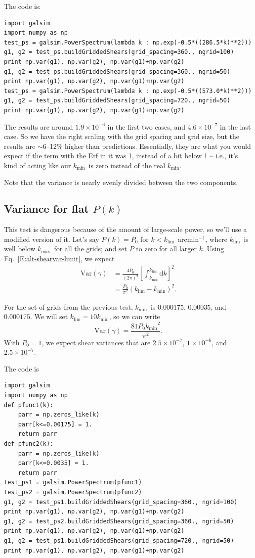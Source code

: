 \documentclass[preprint]{aastex}
\newcommand{\klim}{\ensuremath{k_\mathrm{lim}}}
\newcommand{\kmax}{\ensuremath{k_\mathrm{max}}}
\newcommand{\kmin}{\ensuremath{k_\mathrm{min}}}
\newcommand{\rmd}{\ensuremath{\mathrm{d}}}
\newcommand{\beq}{\begin{equation}}
\newcommand{\eeq}{\end{equation}}
\begin{document}
The code is:
\begin{verbatim}
import galsim
import numpy as np
test_ps = galsim.PowerSpectrum(lambda k : np.exp(-0.5*((286.5*k)**2)))
g1, g2 = test_ps.buildGriddedShears(grid_spacing=360., ngrid=100)
print np.var(g1), np.var(g2), np.var(g1)+np.var(g2)
g1, g2 = test_ps.buildGriddedShears(grid_spacing=360., ngrid=50)
print np.var(g1), np.var(g2), np.var(g1)+np.var(g2)
test_ps = galsim.PowerSpectrum(lambda k : np.exp(-0.5*((573.0*k)**2)))
g1, g2 = test_ps.buildGriddedShears(grid_spacing=720., ngrid=50)
print np.var(g1), np.var(g2), np.var(g1)+np.var(g2)
\end{verbatim}

The results are around $1.9\times 10^{-6}$ in the first two cases, and
$4.6\times 10^{-7}$ in the last case.  So we have the right scaling
with the grid spacing and grid size, but the results are $\sim 6$--12\%
higher than predictions. Essentially, they are what you would expect
if the term with the Erf in it was 1, instead of a bit below 1 --
i.e., it's kind of acting like our \kmin\ is zero instead of the real
\kmin.

Note that the variance is nearly evenly divided between the two components.

\subsection{Variance for flat $P(k)$}

This test is dangerous because of the amount of large-scale power, so
we'll use a modified version of it.  Let's say $P(k)=P_0$ for
$k<$\klim\ arcmin$^{-1}$, where \klim\ is well below \kmax\ for all the
grids; and set $P$ to zero for all larger $k$. Using Eq.~\ref{E:alt-shearvar-limit}, we expect
\begin{align}
\mathrm{Var}(\gamma) &= \frac{4P_0}{(2\pi)^2}
\left[\int_{\kmin}^{\klim} \rmd k\right]^2 \\
 &= \frac{P_0}{\pi^2} \left(\klim-\kmin\right)^2.
\end{align}

For the set of grids from the previous test, \kmin\ is
$0.000175$, $0.00035$, and $0.000175$.  We will set $\klim=10\kmin$,
so we can write
\beq
\mathrm{Var}(\gamma) = \frac{81 P_0 \kmin^2}{\pi^2}.
\eeq
With $P_0=1$, we expect
shear variances that are $2.5\times 10^{-7}$, $1\times 10^{-6}$,
and $2.5\times 10^{-7}$.

The code is
\begin{verbatim}
import galsim
import numpy as np
def pfunc1(k):
    parr = np.zeros_like(k)
    parr[k<=0.00175] = 1.
    return parr
def pfunc2(k):
    parr = np.zeros_like(k)
    parr[k<=0.0035] = 1.
    return parr
test_ps1 = galsim.PowerSpectrum(pfunc1)
test_ps2 = galsim.PowerSpectrum(pfunc2)
g1, g2 = test_ps1.buildGriddedShears(grid_spacing=360., ngrid=100)
print np.var(g1), np.var(g2), np.var(g1)+np.var(g2)
g1, g2 = test_ps2.buildGriddedShears(grid_spacing=360., ngrid=50)
print np.var(g1), np.var(g2), np.var(g1)+np.var(g2)
g1, g2 = test_ps1.buildGriddedShears(grid_spacing=720., ngrid=50)
print np.var(g1), np.var(g2), np.var(g1)+np.var(g2)
\end{verbatim}
\end{document}
